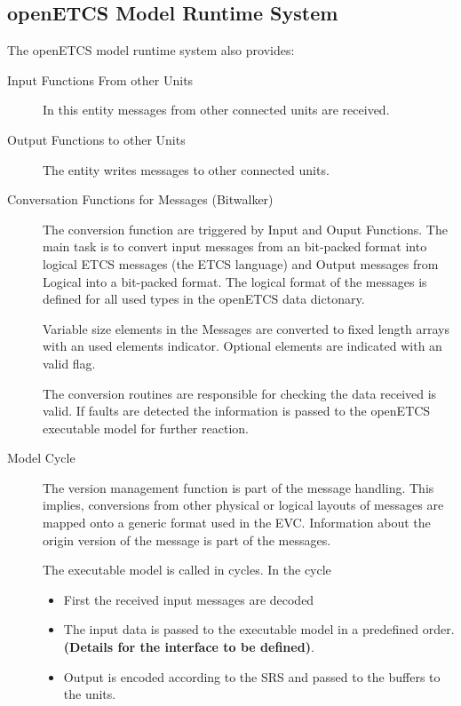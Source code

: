 \subsection{openETCS Model Runtime System}
The openETCS model runtime system also provides:
\begin{description}

\item[Input Functions From other Units]
In this entity messages from other connected units are received.

\item[Output Functions to other Units]
The entity writes messages to other connected units.

\item[Conversation Functions for Messages (Bitwalker)]
The conversion function are triggered by Input and Ouput Functions. The main task is to convert input messages from an bit-packed format into logical ETCS messages (the ETCS language) and Output messages from Logical into a bit-packed format. The logical format of the messages is defined for all used types in the openETCS data dictonary.

Variable size elements in the Messages are converted to fixed length arrays with an used elements indicator. Optional elements are indicated with an valid flag.

The conversion routines are responsible for checking the data received is valid. If  faults are detected the information is passed to the openETCS executable model for further reaction. 

\item[Model Cycle]
The version management function is part of the message handling. This implies, conversions from other physical or logical layouts of messages are mapped onto a generic format used in the EVC. Information about the origin version of the message is part of the messages.
 
The executable model is called in cycles. In the cycle 
\begin{itemize}
\item First the received input messages are decoded
\item The input data is passed to the executable model in a predefined order. \textbf{(Details for the interface to be defined)}.
\item Output is encoded according to the {SRS} and passed to the  buffers to the units.
\end{itemize}
\end{description}


